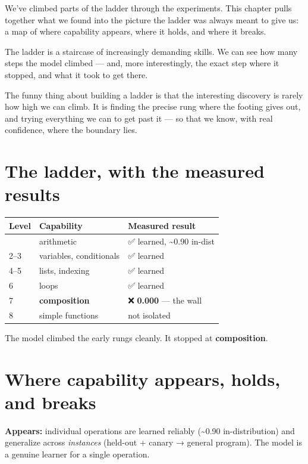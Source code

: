 We've climbed parts of the ladder through the experiments. This chapter
pulls together what we found into the picture the ladder was always
meant to give us: a map of where capability appears, where it holds, and
where it breaks.

The ladder is a staircase of increasingly demanding skills. We can see
how many steps the model climbed --- and, more interestingly, the exact
step where it stopped, and what it took to get there.

The funny thing about building a ladder is that the interesting
discovery is rarely how high we can climb. It is finding the precise
rung where the footing gives out, and trying everything we can to get
past it --- so that we know, with real confidence, where the boundary
lies.

\section{The ladder, with the measured
results}\label{the-ladder-with-the-measured-results}

\begin{longtable}[]{@{}lll@{}}
\toprule\noalign{}
Level & Capability & Measured result \\
\midrule\noalign{}
\endhead
\bottomrule\noalign{}
\endlastfoot
1 & arithmetic & ✅ learned, \textasciitilde0.90 in-dist \\
2--3 & variables, conditionals & ✅ learned \\
4--5 & lists, indexing & ✅ learned \\
6 & loops & ✅ learned \\
7 & \textbf{composition} & ❌ \textbf{0.000} --- the wall \\
8 & simple functions & not isolated \\
\end{longtable}

The model climbed the early rungs cleanly. It stopped at
\textbf{composition}.

\section{Where capability appears, holds, and
breaks}\label{where-capability-appears-holds-and-breaks}

\textbf{Appears:} individual operations are learned reliably
(\textasciitilde0.90 in-distribution) and generalize across
\emph{instances} (held-out + canary → general program). The model is a
genuine learner for a single operation.


